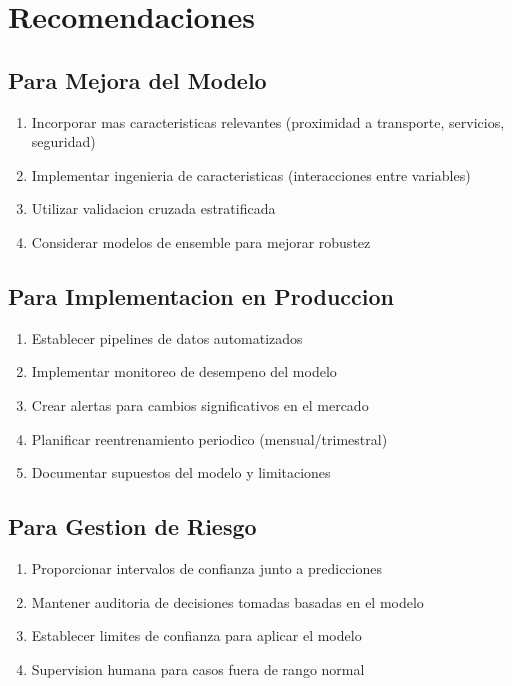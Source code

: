 \documentclass[12pt,a4paper]{article}
\begin{document}
\section{Recomendaciones}

\subsection{Para Mejora del Modelo}
\begin{enumerate}
    \item Incorporar mas caracteristicas relevantes (proximidad a transporte, servicios, seguridad)
    \item Implementar ingenieria de caracteristicas (interacciones entre variables)
    \item Utilizar validacion cruzada estratificada
    \item Considerar modelos de ensemble para mejorar robustez
\end{enumerate}

\subsection{Para Implementacion en Produccion}
\begin{enumerate}
    \item Establecer pipelines de datos automatizados
    \item Implementar monitoreo de desempeno del modelo
    \item Crear alertas para cambios significativos en el mercado
    \item Planificar reentrenamiento periodico (mensual/trimestral)
    \item Documentar supuestos del modelo y limitaciones
\end{enumerate}

\subsection{Para Gestion de Riesgo}
\begin{enumerate}
    \item Proporcionar intervalos de confianza junto a predicciones
    \item Mantener auditoria de decisiones tomadas basadas en el modelo
    \item Establecer limites de confianza para aplicar el modelo
    \item Supervision humana para casos fuera de rango normal
\end{enumerate}
\end{document}
